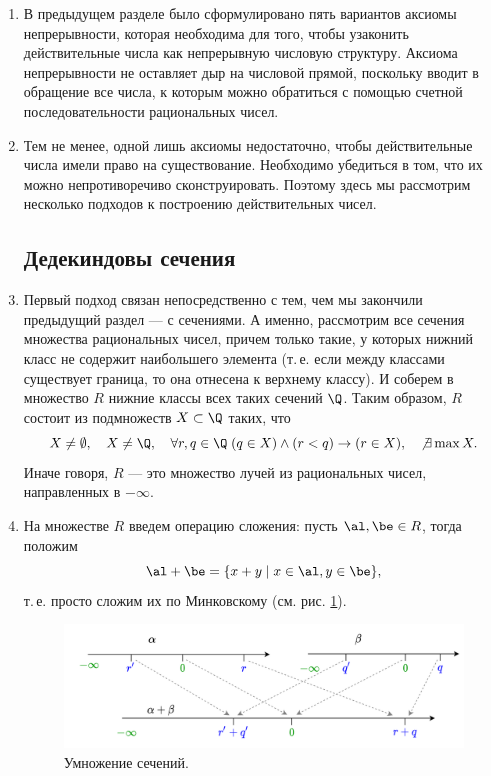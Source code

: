 \begin{enumerate}
\item В предыдущем разделе было сформулировано пять вариантов аксиомы непрерывности, которая необходима для того, чтобы узаконить действительные числа как непрерывную числовую структуру. Аксиома непрерывности не оставляет дыр на числовой прямой, поскольку вводит в обращение все числа, к которым можно обратиться с помощью счетной последовательности рациональных чисел.
\item Тем не менее, одной лишь аксиомы недостаточно, чтобы действительные числа имели право на существование. Необходимо убедиться в том, что их можно непротиворечиво сконструировать. Поэтому здесь мы рассмотрим несколько подходов к построению действительных чисел.

\subsection*{Дедекиндовы сечения}

\item Первый подход связан непосредственно с тем, чем мы закончили предыдущий раздел --- с сечениями. А именно, рассмотрим все сечения множества рациональных чисел, причем только такие, у которых нижний класс не содержит наибольшего элемента (т.\,е. если между классами существует граница, то она отнесена к верхнему классу). И соберем в множество $R$ нижние классы всех таких сечений $\Q$. Таким образом, $R$ состоит из подмножеств $X\subset\Q$ таких, что
$$
X\ne\emptyset,\quad X\ne\Q,\quad\forall r,q\in\Q\;(q\in X)\land(r<q)\to(r\in X),\quad\not\exists\max X.
$$
Иначе говоря, $R$ --- это множество лучей из рациональных чисел, направленных в $-\infty$.
\item На множестве $R$ введем операцию сложения: пусть $\al,\be\in R$, тогда положим
$$
\al+\be = \{x+y\mid x\in \al,y\in \be\},
$$
т.\,е. просто сложим их по Минковскому (см. рис. \ref{AddingR}).

\begin{figure}[hbt!]
\begin{center}
\includegraphics[scale=0.25]{AddingR.png}
\end{center}\caption{Умножение сечений.} \label{AddingR}
\end{figure}



\end{enumerate}
